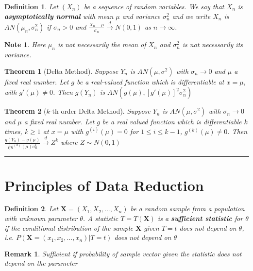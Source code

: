 \documentclass[14pt,twoside]{extreport}
\newcommand{\hhrule}{\vspace{1cm}\hrule\vspace{1cm}}
\theoremstyle{dotless}
\newtheorem*{defn}{Definition}
\newtheorem*{thm}{Theorem} %
\newtheorem*{note}{Note} %
\newtheorem*{remark}{Remark} %
\begin{document}
\begin{defn}
    Let $(X_n)$ be a sequence of random variables. We say that $X_n$ is \textbf{asymptotically normal} with mean $\mu$ and variance $\sigma_n^2$ and we write $X_n$ is $AN(\mu_n, \sigma_n^2)$ if $\sigma_n > 0$ and $\frac{X_n - \mu}{\sigma_n} \overset{d}{\to} N(0,1)$ as $n \to \infty$.
\end{defn}

\begin{note}
    Here $\mu_n$ is not necessarily the mean of $X_n$ and $\sigma_n^2$  is not necessarily its variance.
\end{note}

\begin{thm}[Delta Method]
    Suppose $Y_n$ is $AN(\mu, \sigma^2)$ with $\sigma_n \to 0$ and $\mu$ a fixed real number. 
    Let $g$ be a real-valued function which is differentiable at $x = \mu$, with $g'(\mu) \neq 0$. 
    Then $g(Y_n)$ is $AN(g(\mu), [g'(\mu)]^2 \sigma_n^2)$
\end{thm}

\begin{thm}[$k$-th order Delta Method]
    Suppose $Y_n$ is $AN(\mu, \sigma^2)$ with $\sigma_n \to 0$ and $\mu$ a fixed real number. 
    Let $g$ be a real valued function which is differentiable $k$ times, $k \geq 1$ at $x = \mu$ with $g^{(i)}(\mu) = 0$ for $1 \leq i \leq k - 1$, $g^{(k)}(\mu) \neq 0$. Then $\frac{g(Y_n) - g(\mu)}{\frac{1}{k!} g^{(k)}(\mu) \sigma_n^k} \overset{d}{\to} Z^k$ where $Z \sim N(0,1)$
\end{thm}

\hhrule

\section*{Principles of Data Reduction}

\begin{defn}
    Let $\bm{X} = (X_1, X_2, ..., X_n)$ be a random sample from a population with unknown parameter $\theta$. A statistic $T = T(\bm{X})$ is a \textbf{sufficient statistic} for $\theta$ if the conditional distribution of the sample $\bm{X}$ given $T = t$ does not depend on $\theta$, i.e. $P(\bm{X}=(x_1, x_2, ..., x_n) | T = t)$ does not depend on $\theta$
\end{defn}

\begin{remark}
    Sufficient if probability of sample vector given the statistic does not depend on the parameter
\end{remark}
\end{document}
